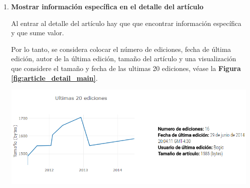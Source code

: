 \begin{enumerate}
  En donde \textbf{chartType} es para pasarle el tipo de gráfica que queremos desplegar, \textbf{chartX} y \textbf{chartY} correponde el set de datos para ambos ejes, \textbf{chartXTitle} y \textbf{chartYTitle} describe el título de ambos ejes y \textbf{chartTitle} hace referencia al título de la visualización.
  
  
  Se consideró hacer el componente de tal forma que fuera reactivo al cambio dimensión de la pantalla, es decir, las visualizaciones son \textit{responsive}.
  
  \begin{verbatim}
  this.resizeService.onResize$.subscribe(() =>
    Plotly.Plots.resize(this.gd)
  );
  \end{verbatim}
  
  Haciendo uso del patrón \textit{observer}, con ayuda de la biblioteca ReactiveX \footnote{\url{http://reactivex.io/}}, cada vez que la pantalla cambia su posición se notifica mediante un servicio y se ajusta el tamaño de la visualización.
  
  \smallbreak
  \item\textbf{Mostrar información específica en el detalle del artículo}
  \smallbreak

  Al entrar al detalle del artículo hay que que encontrar información específica y que sume valor.
  
  Por lo tanto, se considera colocar el número de ediciones, fecha de última edición, autor de la última edición, tamaño del artículo y una visualización que considere el tamaño y fecha de las ultimas 20 ediciones, véase la \textbf{Figura \ref{fig:article_detail_main}}.
  
  \begin{center}
      \bigbreak
      \includegraphics[scale=0.5]{images/marco_aplicativo/article_detail_main.png}
      \label{fig:article_detail_main}
      \bigbreak
  \end{center}
  

\end{enumerate}
